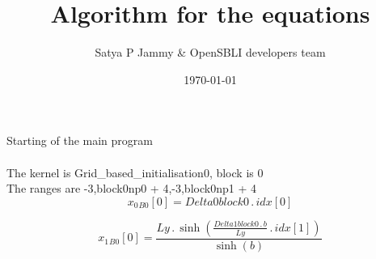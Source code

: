 \documentclass{article}
\title{Algorithm for the equations}
\author{Satya P Jammy \& OpenSBLI developers team}
\date{\today}
\begin{document}
\maketitle
\noindent Starting of the main program\\
\\\noindent The kernel is Grid_based_initialisation0, block is 0\\\noindent The ranges are -3,block0np0 + 4,-3,block0np1 + 4\\\begin{dmath}{x_{0}{_{B0}}}[{0}] = Delta0block0 \,.\, {idx}[{0}]\end{dmath}

\begin{dmath}{x_{1}{_{B0}}}[{0}] = \frac{Ly \,.\, \sinh{\left (\frac{Delta1block0 \,.\, b}{Ly} \,.\, {idx}[{1}] \right )}}{\sinh{\left (b \right )}}\end{dmath}
\end{document}
